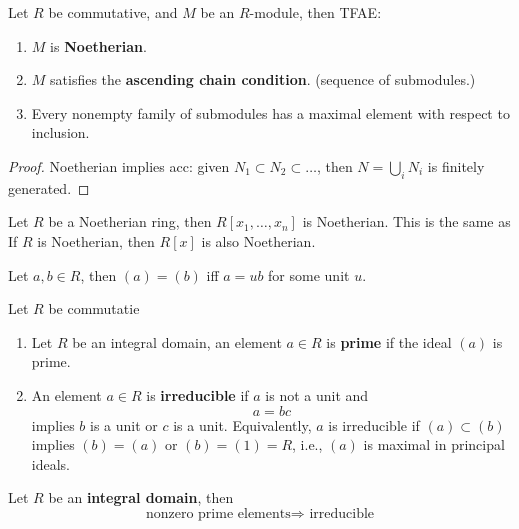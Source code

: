 \documentclass[openany]{book}
\begin{document}
\begin{prop}
    Let $R$ be commutative, and $M$ be an $R$-module, then TFAE:
    \begin{enumerate}
        \item $M$ is \textbf{Noetherian}.
        \item $M$ satisfies the \textbf{ascending chain condition}. (sequence of submodules.)
        \item Every nonempty family of submodules has a maximal element with respect to inclusion.
    \end{enumerate}
\end{prop}
\begin{proof}
    Noetherian implies acc: given $N_1\subset N_2\subset\dots$, then $N=\bigcup_iN_i$ is finitely generated. 
\end{proof}


\begin{prop}
    Let $R$ be a Noetherian ring, then $R[x_1,\dots, x_n]$ is Noetherian. This is the same as If $R$ is Noetherian, then $R[x]$ is also Noetherian.
\end{prop}

\begin{prop}
    Let $a,b\in R$, then $(a)=(b)$ iff $a=ub$ for some unit $u$.
\end{prop}



\begin{defn}
    Let $R$ be commutatie
    \begin{enumerate}
        \item Let $R$ be an integral domain, an element $a\in R$ is \textbf{prime} if the ideal $(a)$ is prime.
        \item An element $a\in R$ is \textbf{irreducible} if $a$ is not a unit and 
        \begin{equation*}
            a=bc
        \end{equation*}
        implies $b$ is a unit or $c$ is a unit. Equivalently, $a$ is irreducible if $(a)\subset (b)$ implies $(b)=(a)$ or $(b)=(1)=R$, i.e., $(a)$ is maximal in principal ideals.
    \end{enumerate}
\end{defn}

\begin{prop}
    Let $R$ be an \textbf{integral domain}, then 
    \begin{equation*}
        \text{nonzero prime elements}\Rightarrow \text{ irreducible}
    \end{equation*}
\end{prop}
\end{document}
